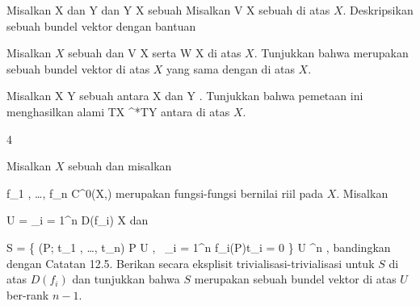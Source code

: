 {}
{

Misalkan
\mathkor {} {X} {dan} {Y} {}
dan
\maabb {\varphi} {Y} {X
} {}
sebuah
Misalkan
 {V} {X
} {}
sebuah
di atas $X$. Deskripsikan
sebuah bundel vektor dengan bantuan

}
{} {}

{}
{

Misalkan $X$ sebuah
dan
 { V } { X
} {}
serta
 { W } { X
} {}
di atas $X$. Tunjukkan bahwa
 {} {}
merupakan sebuah bundel vektor di atas $X$ yang sama dengan
di atas $X$.

}
{} {}

{}
{

Misalkan
\maabb {\varphi} { X } { Y
} {}
sebuah
antara
\mathkor {} {X} {dan} {Y} {.}
Tunjukkan bahwa pemetaan ini menghasilkan
alami
 {TX} { \varphi^*TY
} {}
antara
di atas $X$.

}
{} {}


{4}
{

Misalkan $X$ sebuah
dan misalkan

\mavergleichskette
{\vergleichskette
{ f_1 , \ldots , f_n
}
{ \in }{ C^0(X,\R)
}
{  }{
}
{    }{
}
{   }{
}
}
{}{}{}
merupakan fungsi-fungsi bernilai riil
pada $X$. Misalkan

\mavergleichskette
{\vergleichskette
{ U
}
{ = }{ \bigcup_{i = 1}^n D(f_i)
}
{ \subseteq }{ X
}
{    }{
}
{   }{
}
}
{}{}{}
dan

\mavergleichskettedisp
{\vergleichskette
{ S
}
{ =} { \left\{ (P; t_1 , \ldots , t_n)  \mid  P \in U , \,  \sum_{i = 1}^n f_i(P)t_i = 0       \right\}
}
{ \subseteq} { U \times \R^n
}
{ } {
}
{ } {
}
}
{}{}{,}
bandingkan dengan
Catatan 12.5.
Berikan secara eksplisit trivialisasi-trivialisasi untuk $S$ di atas $D(f_i)$ dan tunjukkan bahwa $S$ merupakan sebuah bundel vektor di atas $U$ ber-rank $n-1$.

}
{} {}

